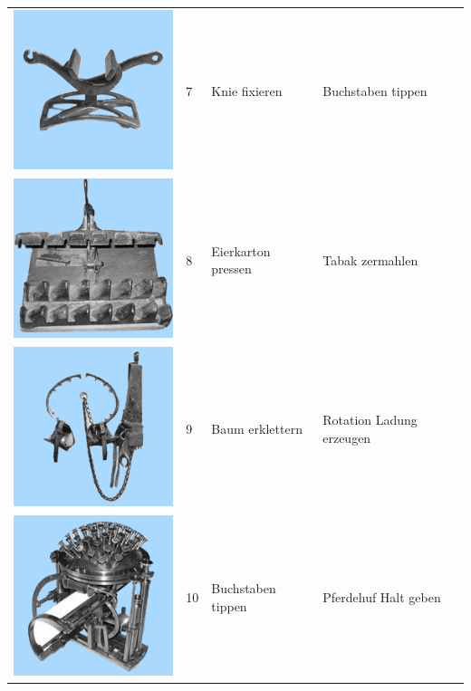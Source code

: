 \documentclass[
  english,
  man,floatsintext]{apa7}
\begin{document}
\begin{center}
\begin{ThreePartTable}
\begin{longtable}{llll}
\includegraphics[valign=c, scale=0.19]{../materials/unfamiliar/7.png} & 7 & Knie fixieren & Buchstaben tippen\\
\includegraphics[valign=c, scale=0.19]{../materials/unfamiliar/8.png} & 8 & Eierkarton pressen & Tabak zermahlen\\
\includegraphics[valign=c, scale=0.19]{../materials/unfamiliar/9.png} & 9 & Baum erklettern & Rotation Ladung erzeugen\\
\includegraphics[valign=c, scale=0.19]{../materials/unfamiliar/10.png} & 10 & Buchstaben tippen & Pferdehuf Halt geben\\

\end{longtable}
\end{ThreePartTable}
\end{center}
\end{document}
